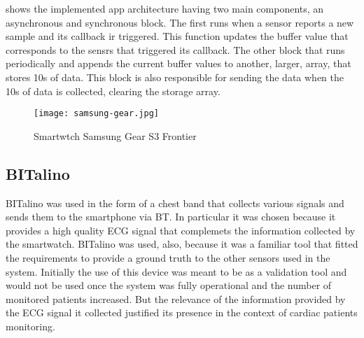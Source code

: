  shows the implemented app architecture having two main components, an asynchronous and synchronous block. The first runs when a sensor reports a new sample and its callback ir triggered. This function updates the buffer value that corresponds to the sensrs that triggered its callback. The other block that runs periodically and appends the current buffer values to another, larger, array, that stores 10s of data. This block is also responsible for sending the data when the 10s of data is collected, clearing the storage array.





\begin{figure}[!h]
	\centering
	\texttt{[image: samsung-gear.jpg]}
	\caption{Smartwtch Samsung Gear S3 Frontier}
	\label{fig:watch}
\end{figure}

\FloatBarrier

\subsection{BITalino}


BITalino\cite{bitalinoguerreiro2013bitalino}  was used in the form of a chest band that collects various signals and sends them to the smartphone via BT. In particular it was chosen because it provides a high quality ECG signal \cite{bitalinobatista2017experimental,bitalinoguerreiro2013bitalino} that complemets the information collected by the smartwatch. BITalino was used, also, because it was a familiar tool that fitted the requirements to provide a ground truth to the other sensors used in the system. Initially the use of this device was meant to be as a validation tool and would not be used once the system was fully operational and the number of monitored patients increased. But the relevance of the information provided by the ECG signal it collected justified its presence in the context of cardiac patients monitoring.

